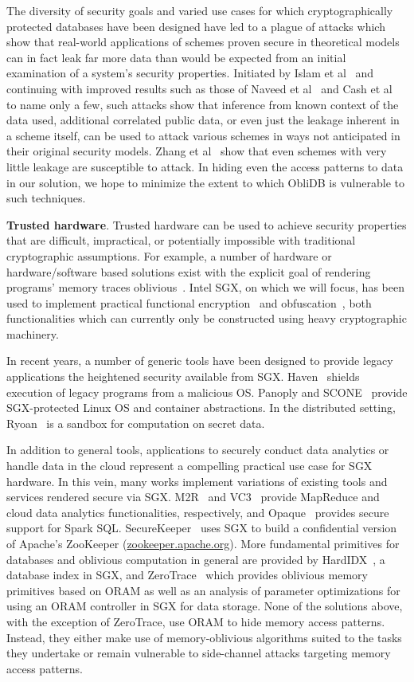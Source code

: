\documentclass[letterpaper,twocolumn,10pt]{article}
\def\name/{ObliDB}
\begin{document}
The diversity of security goals and varied use cases for which cryptographically protected databases have been designed have led to a plague of attacks which show that real-world applications of schemes proven secure in theoretical models can in fact leak far more data than would be expected from an initial examination of a system's security properties. Initiated by Islam et al~\cite{IKK12} and continuing with improved results such as those of Naveed et al~\cite{NKW15} and Cash et al~\cite{CGPR15} to name only a few, such attacks show that inference from known context of the data used, additional correlated public data, or even just the leakage inherent in a scheme itself, can be used to attack various schemes in ways not anticipated in their original security models. Zhang et al~\cite{ZKP16} show that even schemes with very little leakage are susceptible to attack. In hiding even the access patterns to data in our solution, we hope to minimize the extent to which \name/ is vulnerable to such techniques.   

  \noindent \textbf{Trusted hardware}. 
Trusted hardware can be used to achieve security properties that are difficult, impractical, or potentially impossible with traditional cryptographic assumptions. For example, a number of hardware or hardware/software based solutions exist with the explicit goal of rendering programs' memory traces oblivious~\cite{CLD16, LHM+15, MLS+13}. Intel SGX, on which we will focus, has been used to implement practical functional encryption~\cite{FVBG16} and obfuscation~\cite{NFR+17}, both functionalities which can currently only be constructed using heavy cryptographic machinery.

In recent years, a number of generic tools have been designed to provide legacy applications the heightened security available from SGX. Haven~\cite{BPH15} shields execution of legacy programs from a malicious OS. Panoply and SCONE~\cite{STTS17, ATG+16} provide SGX-protected Linux OS and container abstractions. In the distributed setting, Ryoan~\cite{HZX+16} is a sandbox for computation on secret data. 

In addition to general tools, applications to securely conduct data analytics or handle data in the cloud represent a compelling practical use case for SGX hardware. In this vein, many works implement variations of existing tools and services rendered secure via SGX. M2R~\cite{DSC+15} and VC3~\cite{SCF+15} provide MapReduce and cloud data analytics functionalities, respectively, and Opaque~\cite{ZDB+17} provides secure support for Spark SQL. SecureKeeper~\cite{BWG+16} uses SGX to build a confidential version of Apache's ZooKeeper (\url{zookeeper.apache.org}). More fundamental primitives for databases and oblivious computation in general are provided by HardIDX~\cite{FBB+17}, a database index in SGX, and ZeroTrace~\cite{SGF17} which provides oblivious memory primitives based on ORAM as well as an analysis of parameter optimizations for using an ORAM controller in SGX for data storage. None of the solutions above, with the exception of ZeroTrace, use ORAM to hide memory access patterns. Instead, they either make use of memory-oblivious algorithms suited to the tasks they undertake or remain vulnerable to side-channel attacks targeting memory access patterns. 
\end{document}
